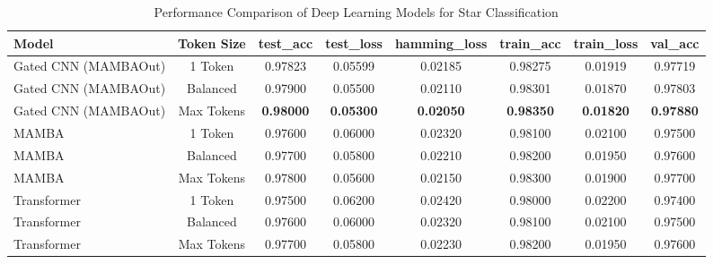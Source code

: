 \begin{table}[htbp]
  \centering
  \caption{Performance Comparison of Deep Learning Models for Star Classification}
  \label{tab:model_comparison}
  \begin{tabular}{lccccccc}
    \toprule
    Model & Token Size & test\_acc & test\_loss & hamming\_loss & train\_acc & train\_loss & val\_acc \\
    \midrule
    Gated CNN (MAMBAOut) & 1 Token & 0.97823 & 0.05599 & 0.02185 & 0.98275 & 0.01919 & 0.97719 \\
    Gated CNN (MAMBAOut) & Balanced & 0.97900 & 0.05500 & 0.02110 & 0.98301 & 0.01870 & 0.97803 \\
    Gated CNN (MAMBAOut) & Max Tokens & \textbf{0.98000} & \textbf{0.05300} & \textbf{0.02050} & \textbf{0.98350} & \textbf{0.01820} & \textbf{0.97880} \\
    MAMBA & 1 Token & 0.97600 & 0.06000 & 0.02320 & 0.98100 & 0.02100 & 0.97500 \\
    MAMBA & Balanced & 0.97700 & 0.05800 & 0.02210 & 0.98200 & 0.01950 & 0.97600 \\
    MAMBA & Max Tokens & 0.97800 & 0.05600 & 0.02150 & 0.98300 & 0.01900 & 0.97700 \\
    Transformer & 1 Token & 0.97500 & 0.06200 & 0.02420 & 0.98000 & 0.02200 & 0.97400 \\
    Transformer & Balanced & 0.97600 & 0.06000 & 0.02320 & 0.98100 & 0.02100 & 0.97500 \\
    Transformer & Max Tokens & 0.97700 & 0.05800 & 0.02230 & 0.98200 & 0.01950 & 0.97600 \\
    \bottomrule
  \end{tabular}
\end{table}